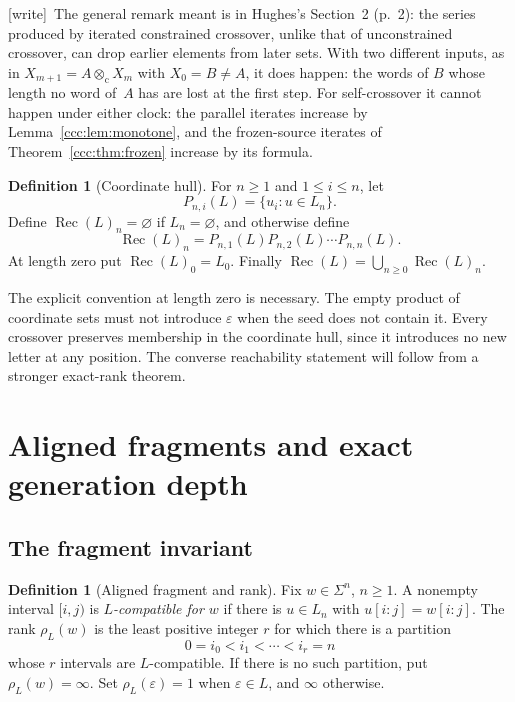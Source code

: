 \documentclass[11pt,letterpaper]{article}
\theoremstyle{definition}
\newtheorem{definition}[theorem]{Definition}
\theoremstyle{remark}
\newcommand{\eps}{\varepsilon}
\newcommand{\rec}{\operatorname{Rec}}
\newcommand{\cut}{\otimes_{\mathrm c}}
\newcommand{\rank}{\rho}
\newcommand{\wtag}{\textup{[write]}}
\begin{document}
\wtag\ The general remark meant is in Hughes's Section~2 (p.~2): the series
produced by iterated constrained crossover, unlike that of unconstrained
crossover, can drop earlier elements from later sets. With two different
inputs, as in $X_{m+1}=A\cut X_m$ with $X_0=B\ne A$, it does happen: the words of
$B$ whose length no word of~$A$ has are lost at the first step. For
self-crossover it cannot happen under either clock: the parallel iterates
increase by Lemma~\ref{ccc:lem:monotone}, and the frozen-source iterates of
Theorem~\ref{ccc:thm:frozen} increase by its formula.

\begin{definition}[Coordinate hull]\label{ccc:def:hull}
For $n\geq1$ and $1\leq i\leq n$, let
\[
 P_{n,i}(L)=\{u_i:u\in L_n\}.
\]
Define $\rec(L)_n=\varnothing$ if $L_n=\varnothing$, and otherwise define
\[
 \rec(L)_n=P_{n,1}(L)P_{n,2}(L)\cdots P_{n,n}(L).
\]
At length zero put $\rec(L)_0=L_0$. Finally
$\rec(L)=\bigcup_{n\geq0}\rec(L)_n$.
\end{definition}

The explicit convention at length zero is necessary. The empty product of
coordinate sets must not introduce $\eps$ when the seed does not contain it.
Every crossover preserves membership in the coordinate hull, since it
introduces no new letter at any position. The converse reachability statement
will follow from a stronger exact-rank theorem.

\section{Aligned fragments and exact generation depth}\label{ccc:sec:rank}

\subsection{The fragment invariant}

\begin{definition}[Aligned fragment and rank]\label{ccc:def:rank}
Fix $w\in\Sigma^n$, $n\geq1$. A nonempty interval $[i,j)$ is
\emph{$L$-compatible for $w$} if there is $u\in L_n$ with
$u[i:j]=w[i:j]$.
The rank $\rank_L(w)$ is the least positive integer $r$ for which there is a
partition
\begin{equation}
 0=i_0<i_1<\cdots<i_r=n
 \label{ccc:eq:partition}
\end{equation}
whose $r$ intervals are $L$-compatible. If there is no such partition, put
$\rank_L(w)=\infty$. Set $\rank_L(\eps)=1$ when $\eps\in L$, and $\infty$
otherwise.
\end{definition}
\end{document}
